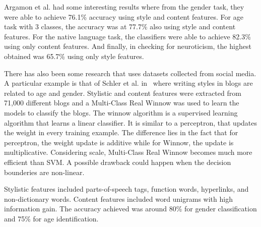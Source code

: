 \documentclass[a4paper]{llncs}
\begin{document}
Argamon et al. had some interesting results where from the gender task, they were able to achieve 76.1\% accuracy using style and content features. For age task with 3 classes, the accuracy was at 77.7\% also using style and content features. For the native language task, the classifiers were able to achieve 82.3\% using only content features. And finally, in checking for neuroticism, the highest obtained was 65.7\% using only style features. 

There has also been some research that uses datasets collected from social media. A particular example is that of Schler et al. in~\cite{schler2006effects} where writing styles in blogs are related to age and gender. Stylistic and content features were extracted from 71,000 different blogs and a Multi-Class Real Winnow was used to learn the models to classify the blogs. The winnow algorithm is a supervised learning algorithm that learns a linear classifier. It is similar to a perceptron, that updates the weight in every training example. The difference lies in the fact that for perceptron, the weight update is additive while for Winnow, the update is multiplicative. Considering scale, Multi-Class Real Winnow becomes much more efficient than SVM. A possible drawback could happen when the decision bounderies are non-linear. 

Stylistic features included parts-of-speech tags, function words, hyperlinks, and non-dictionary words. Content features included word unigrams with high information gain. The accuracy achieved was around 80\% for gender classification and 75\% for age identification.  
\end{document}
